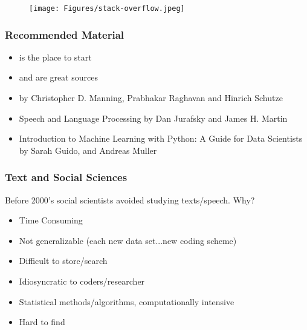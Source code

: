 \documentclass[compress, aspectratio=54]{beamer}
\begin{document}
\begin{frame}
\begin{figure}

\texttt{[image: Figures/stack-overflow.jpeg]}
\end{figure}

\end{frame}

\begin{frame}
\frametitle{Recommended Material}
\begin{itemize}
\item \href{https://www.codecademy.com/catalog/language/python}{\color{ blue}{Codecademy}} is the place to start
\item \href{https://automatetheboringstuff.com/}{\color{ blue}{Automate the Boring Stuff with Python}} and \href{https://realpython.com/}{\color{ blue}{The Real Python}} are great sources
%
\item \href{https://nlp.stanford.edu/IR-book/information-retrieval-book.html}{\color{ blue}{Introduction to Information Retrieval}} by Christopher D. Manning, Prabhakar Raghavan and Hinrich Schutze

\item  Speech and Language Processing by Dan Jurafsky and James H. Martin
\item  Introduction to Machine Learning with Python: A Guide for Data Scientists by Sarah Guido, and Andreas Muller
\end{itemize}
\end{frame}

\begin{frame}
\frametitle{Text and Social Sciences}
 Before 2000's social scientists avoided studying texts/speech. Why?
\begin{itemize}
\item Time Consuming
\item Not generalizable (each new data set...new coding scheme)
\item Difficult to store/search
\item Idiosyncratic to coders/researcher
\item Statistical methods/algorithms, computationally intensive
\item Hard to find

\end{itemize}
\end{frame}
\end{document}
